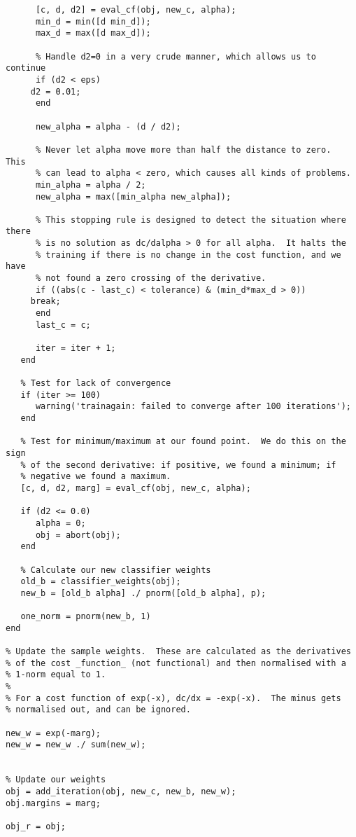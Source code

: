 {\begin{verbatim}
      [c, d, d2] = eval_cf(obj, new_c, alpha);
      min_d = min([d min_d]);
      max_d = max([d max_d]);
      
      % Handle d2=0 in a very crude manner, which allows us to continue
      if (d2 < eps)
	 d2 = 0.01;
      end
      
      new_alpha = alpha - (d / d2);
      
      % Never let alpha move more than half the distance to zero.  This
      % can lead to alpha < zero, which causes all kinds of problems.
      min_alpha = alpha / 2;
      new_alpha = max([min_alpha new_alpha]);
      
      % This stopping rule is designed to detect the situation where there
      % is no solution as dc/dalpha > 0 for all alpha.  It halts the
      % training if there is no change in the cost function, and we have
      % not found a zero crossing of the derivative.
      if ((abs(c - last_c) < tolerance) & (min_d*max_d > 0))
	 break;
      end
      last_c = c;
      
      iter = iter + 1;
   end

   % Test for lack of convergence
   if (iter >= 100)
      warning('trainagain: failed to converge after 100 iterations');
   end
   
   % Test for minimum/maximum at our found point.  We do this on the sign
   % of the second derivative: if positive, we found a minimum; if
   % negative we found a maximum.
   [c, d, d2, marg] = eval_cf(obj, new_c, alpha);
   
   if (d2 <= 0.0)
      alpha = 0;
      obj = abort(obj);
   end
   
   % Calculate our new classifier weights   
   old_b = classifier_weights(obj);
   new_b = [old_b alpha] ./ pnorm([old_b alpha], p);

   one_norm = pnorm(new_b, 1)
end

% Update the sample weights.  These are calculated as the derivatives
% of the cost _function_ (not functional) and then normalised with a
% 1-norm equal to 1.
%
% For a cost function of exp(-x), dc/dx = -exp(-x).  The minus gets
% normalised out, and can be ignored.

new_w = exp(-marg);
new_w = new_w ./ sum(new_w);


% Update our weights
obj = add_iteration(obj, new_c, new_b, new_w);
obj.margins = marg;

obj_r = obj;
\end{verbatim}
}
